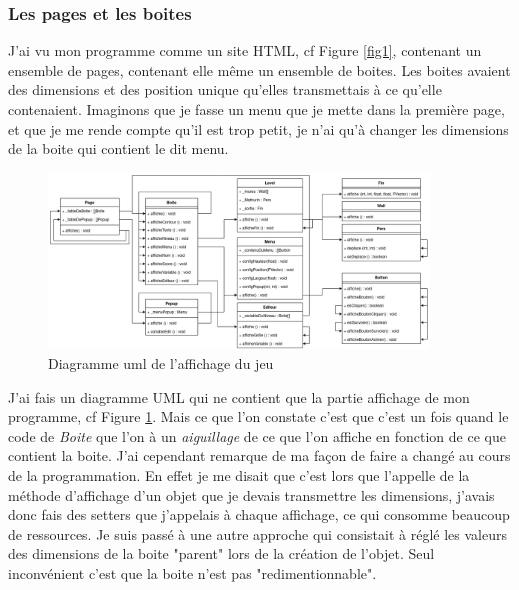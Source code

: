 \documentclass[10pt,a4paper]{article}
\begin{document}
\subsubsection{Les pages et les boites}
J'ai vu mon programme comme un site HTML, cf Figure \ref{fig1}, contenant un ensemble de pages, contenant elle même un ensemble de boites. Les boites avaient des dimensions et des position unique qu'elles transmettais à ce qu'elle contenaient. Imaginons que je fasse un menu que je mette dans la première page, et que je me rende compte qu'il est trop petit, je n'ai qu'à changer les dimensions de la boite qui contient le dit menu. 
\begin{figure}[h!]
	\centering
	\includegraphics[width=0.9\textwidth]{Affichage .png}
  	\caption{Diagramme uml de l'affichage du jeu}
  	\label{fig4}
\end{figure}
J'ai fais un diagramme UML qui ne contient que la partie affichage de mon programme, cf Figure \ref{fig4}. Mais ce que l'on constate c'est que c'est un fois quand le code de \textit{Boite} que l'on à un \textit{aiguillage} de ce que l'on affiche en fonction de ce que contient la boite. J'ai cependant remarque de ma façon de faire a changé au cours de la programmation. En effet je me disait que c'est lors que l'appelle de la méthode d'affichage d'un objet que je devais transmettre les dimensions, j'avais donc fais des setters que j'appelais à chaque affichage, ce qui consomme beaucoup de ressources. Je suis passé à une autre approche qui consistait à réglé les valeurs des dimensions de la boite "parent" lors de la création de l'objet. Seul inconvénient c'est que la boite n'est pas "redimentionnable". 
\end{document}
